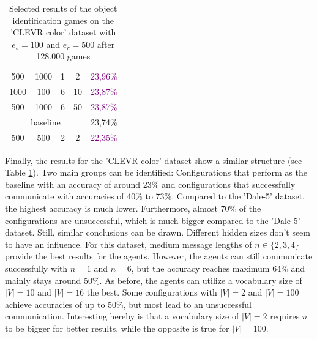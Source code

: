 \begin{table}[ht]
\begin{tabular}{cccc|c}
        {500}                         & {1000}    & {1} & {2}   & \textcolor{purple}{23,96\%}              \\
        {1000}                        & {100}     & {6} & {10}  & \textcolor{purple}{23,87\%}              \\
        {500}                         & {1000}    & {6} & {50}  & \textcolor{purple}{23,87\%}              \\\midrule
        \multicolumn{4}{c|}{baseline} & {23,74\%}                                                          \\\midrule
        {500}                         & {500}     & {2} & {2}   & \textcolor{purple}{22,35\%}              \\
        \bottomrule
    \end{tabular}
    \caption{Selected results of the object identification games on the 'CLEVR color' dataset with $e_s=100$ and $e_r=500$ after 128.000 games}
    \label{tab:results_discriminator_color}
\end{table}

Finally, the results for the 'CLEVR color' dataset show a similar structure (see Table \ref{tab:results_discriminator_color}).
Two main groups can be identified: Configurations that perform as the baseline with an accuracy of around 23\% and configurations that successfully communicate with accuracies of 40\% to 73\%.
Compared to the 'Dale-5' dataset, the highest accuracy is much lower.
Furthermore, almost 70\% of the configurations are unsuccessful, which is much bigger compared to the 'Dale-5' dataset.
Still, similar conclusions can be drawn.
Different hidden sizes don't seem to have an influence.
For this dataset, medium message lengths of $n \in \{2,3,4\}$ provide the best results for the agents.
However, the agents can still communicate successfully with $n=1$ and $n=6$, but the accuracy reaches maximum 64\% and mainly stays around 50\%.
As before, the agents can utilize a vocabulary size of $|V|=10$ and $|V|=16$ the best.
Some configurations with $|V|=2$ and $|V|=100$ achieve accuracies of up to 50\%, but most lead to an unsuccessful communication.
Interesting hereby is that a vocabulary size of $|V|=2$ requires $n$ to be bigger for better results, while the opposite is true for $|V|=100$.

